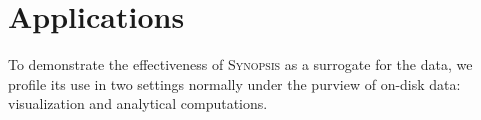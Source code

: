 \section{Applications}
\label{sec:applications}
To demonstrate the effectiveness of \textsc{Synopsis} as a surrogate for the data, we profile its use in two settings normally under the purview of on-disk data: visualization and analytical computations.



